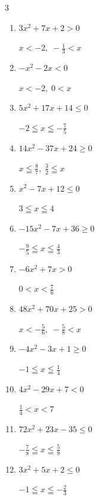 \begin{multicols}{3}
\begin{enumerate}
        $\displaystyle -\frac{3}{8} < x < \frac{9}{8}$

  \item $3x^{2}+7x+2>0$

        $\displaystyle x < -2 , \; -\frac{1}{3} < x$

  \item $-x^{2}-2x<0$

        $\displaystyle x < -2 , \; 0 < x$

  \item $5x^{2}+17x+14\leq 0$

        $\displaystyle -2 \leqq x \leqq -\frac{7}{5}$

  \item $14x^{2}-37x+24\geq 0$

        $\displaystyle x \leqq \frac{8}{7} , \; \frac{3}{2} \leqq x$

  \item $x^{2}-7x+12\leq 0$

        $\displaystyle 3 \leqq x \leqq 4$

\columnbreak %

\resetques

  \item $-15x^{2}-7x+36\geq 0$

        $\displaystyle -\frac{9}{5} \leqq x \leqq \frac{4}{3}$

  \item $-6x^{2}+7x>0$

        $\displaystyle 0 < x < \frac{7}{6}$

  \item $48x^{2}+70x+25>0$

        $\displaystyle x < -\frac{5}{6} , \; -\frac{5}{8} < x$

  \item $-4x^{2}-3x+1\geq 0$

        $\displaystyle -1 \leqq x \leqq \frac{1}{4}$

  \item $4x^{2}-29x+7<0$

        $\displaystyle \frac{1}{4} < x < 7$

  \item $72x^{2}+23x-35\leq 0$

        $\displaystyle -\frac{7}{8} \leqq x \leqq \frac{5}{9}$

  \item $3x^{2}+5x+2\leq 0$

        $\displaystyle -1 \leqq x \leqq -\frac{2}{3}$


\end{enumerate}
\end{multicols}
